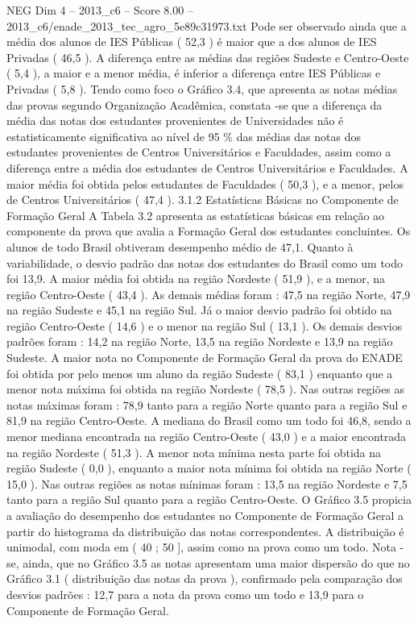 \begin{textsample}{NEG Dim 4 – 2013\_c6 – Score 8.00 – 2013\_c6/enade\_2013\_tec\_agro\_5e89c31973.txt}
Pode ser observado ainda que a média dos alunos de IES Públicas ( 52,3 ) é maior que a dos alunos de IES Privadas ( 46,5 ).
A diferença entre as médias das regiões Sudeste e Centro-Oeste ( 5,4 ), a maior e a menor média, é inferior a diferença entre IES Públicas e Privadas ( 5,8 ).
Tendo como foco o Gráfico 3.4, que apresenta as notas médias das provas segundo Organização Acadêmica, constata -se que a diferença da média das notas dos estudantes provenientes de Universidades não é estatisticamente significativa ao nível de 95 \% das médias das notas dos estudantes provenientes de Centros Universitários e Faculdades, assim como a diferença entre a média dos estudantes de Centros Universitários e Faculdades.
A maior média foi obtida pelos estudantes de Faculdades ( 50,3 ), e a menor, pelos de Centros Universitários ( 47,4 ). 3.1.2 Estatísticas Básicas no Componente de Formação Geral A Tabela 3.2 apresenta as estatísticas básicas em relação ao componente da prova que avalia a Formação Geral dos estudantes concluintes.
Os alunos de todo Brasil obtiveram desempenho médio de 47,1.
Quanto à variabilidade, o desvio padrão das notas dos estudantes do Brasil como um todo foi 13,9.
A maior média foi obtida na região Nordeste ( 51,9 ), e a menor, na região Centro-Oeste ( 43,4 ).
As demais médias foram : 47,5 na região Norte, 47,9 na região Sudeste e 45,1 na região Sul.
Já o maior desvio padrão foi obtido na região Centro-Oeste ( 14,6 ) e o menor na região Sul ( 13,1 ).
Os demais desvios padrões foram : 14,2 na região Norte, 13,5 na região Nordeste e 13,9 na região Sudeste.
A maior nota no Componente de Formação Geral da prova do ENADE foi obtida por pelo menos um aluno da região Sudeste ( 83,1 ) enquanto que a menor nota máxima foi obtida na região Nordeste ( 78,5 ).
Nas outras regiões as notas máximas foram : 78,9 tanto para a região Norte quanto para a região Sul e 81,9 na região Centro-Oeste.
A mediana do Brasil como um todo foi 46,8, sendo a menor mediana encontrada na região Centro-Oeste ( 43,0 ) e a maior encontrada na região Nordeste ( 51,3 ).
A menor nota mínima nesta parte foi obtida na região Sudeste ( 0,0 ), enquanto a maior nota mínima foi obtida na região Norte ( 15,0 ).
Nas outras regiões as notas mínimas foram : 13,5 na região Nordeste e 7,5 tanto para a região Sul quanto para a região Centro-Oeste.
O Gráfico 3.5 propicia a avaliação do desempenho dos estudantes no Componente de Formação Geral a partir do histograma da distribuição das notas correspondentes.
A distribuição é unimodal, com moda em ( 40 ; 50 ], assim como na prova como um todo.
Nota -se, ainda, que no Gráfico 3.5 as notas apresentam uma maior dispersão do que no Gráfico 3.1 ( distribuição das notas da prova ), confirmado pela comparação dos desvios padrões : 12,7 para a nota da prova como um todo e 13,9 para o Componente de Formação Geral.

\end{textsample}
